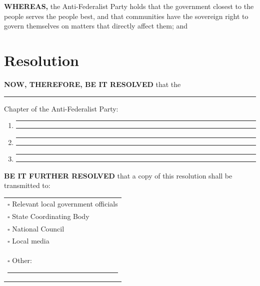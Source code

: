 \documentclass[11pt, letterpaper]{article}
\begin{document}
\noindent\textbf{WHEREAS,} the Anti-Federalist Party holds that the government closest to the people serves the people best, and that communities have the sovereign right to govern themselves on matters that directly affect them; and

\section{Resolution}

\noindent\textbf{NOW, THEREFORE, BE IT RESOLVED} that the \rule{6cm}{0.4pt} Chapter of the Anti-Federalist Party:

\vspace{1em}

\begin{enumerate}[label=\textbf{\arabic*.}]
  \item \rule{\textwidth}{0.4pt}

  \vspace{0.3em}\rule{\textwidth}{0.4pt}

  \vspace{1em}

  \item \rule{\textwidth}{0.4pt}

  \vspace{0.3em}\rule{\textwidth}{0.4pt}

  \vspace{1em}

  \item \rule{\textwidth}{0.4pt}

  \vspace{0.3em}\rule{\textwidth}{0.4pt}
\end{enumerate}

\vspace{1em}

\noindent\textbf{BE IT FURTHER RESOLVED} that a copy of this resolution shall be transmitted to:

\vspace{0.5em}
\noindent
\begin{tabular}{@{}l@{}}
$\square$ \quad Relevant local government officials \\[0.5em]
$\square$ \quad State Coordinating Body \\[0.5em]
$\square$ \quad National Council \\[0.5em]
$\square$ \quad Local media \\[0.5em]
$\square$ \quad Other: \rule{6cm}{0.4pt} \\
\end{tabular}
\end{document}
